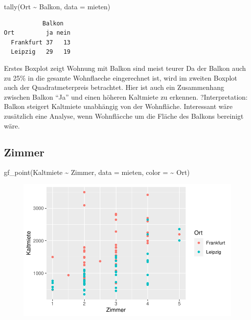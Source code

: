 \documentclass[
  a4paper,
  DIV=11]{scrartcl}
\newenvironment{Shaded}{\begin{snugshade}}{\end{snugshade}}
\newcommand{\AttributeTok}[1]{\textcolor[rgb]{0.40,0.45,0.13}{#1}}
\newcommand{\FunctionTok}[1]{\textcolor[rgb]{0.28,0.35,0.67}{#1}}
\newcommand{\NormalTok}[1]{\textcolor[rgb]{0.00,0.23,0.31}{#1}}
\newcommand{\SpecialCharTok}[1]{\textcolor[rgb]{0.37,0.37,0.37}{#1}}
\begin{document}
\begin{Shaded}
\begin{Highlighting}[]
\FunctionTok{tally}\NormalTok{(Ort }\SpecialCharTok{\textasciitilde{}}\NormalTok{ Balkon, }\AttributeTok{data =}\NormalTok{ mieten)}
\end{Highlighting}
\end{Shaded}

\begin{verbatim}
           Balkon
Ort         ja nein
  Frankfurt 37   13
  Leipzig   29   19
\end{verbatim}

Erstes Boxplot zeigt Wohnung mit Balkon sind meist teurer Da der Balkon
auch zu 25\% in die gesamte Wohnflaeche eingerechnet ist, wird im
zweiten Boxplot auch der Quadratmeterpreis betrachtet. Hier ist auch ein
Zusammenhang zwischen Balkon ``Ja'' und einen höheren Kaltmiete zu
erkennen. ?Interpretation: Balkon steigert Kaltmiete unabhängig von der
Wohnfläche. Interessant wäre zusätzlich eine Analyse, wenn Wohnfläcche
um die Fläche des Balkons bereinigt wäre.

\hypertarget{zimmer}{%
\subsection{Zimmer}\label{zimmer}}

\begin{Shaded}
\begin{Highlighting}[]
\FunctionTok{gf\_point}\NormalTok{(Kaltmiete }\SpecialCharTok{\textasciitilde{}}\NormalTok{ Zimmer, }\AttributeTok{data =}\NormalTok{ mieten, }\AttributeTok{color =} \SpecialCharTok{\textasciitilde{}}\NormalTok{ Ort)}
\end{Highlighting}
\end{Shaded}

\begin{figure}[H]

{\centering \includegraphics{Mietmodellierung_files/figure-pdf/unnamed-chunk-14-1.pdf}

}

\end{figure}
\end{document}
